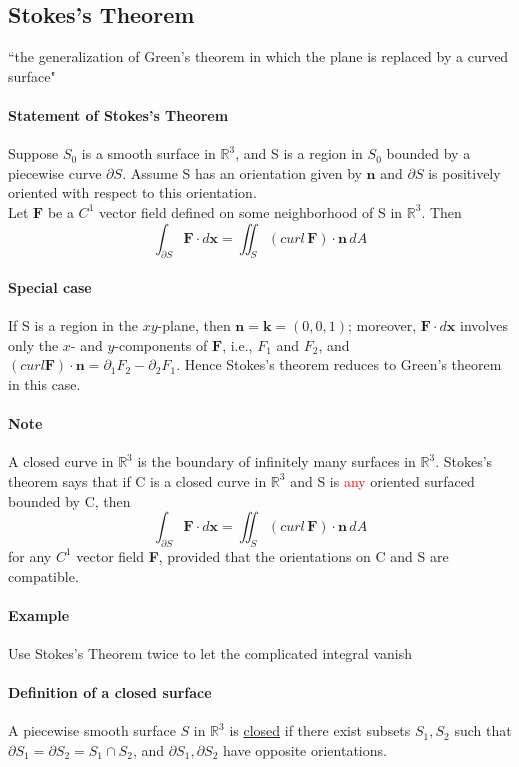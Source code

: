 \documentclass[11pt]{article}
\newcommand{\tb}[1]{\textbf{#1}}
\newcommand{\real}[0]{\mathbb{R}}
\newcommand{\under}[1]{\underline{#1}}
\newcommand{\vx}[0]{\tb{x}}
\newcommand{\vf}[0]{\tb{F}}
\newcommand{\p}[0]{\partial}
\begin{document}
\subsection{Stokes's Theorem}
``the generalization of Green's theorem in which the plane is replaced by a curved surface"
\paragraph{Statement of Stokes's Theorem} Suppose $S_0$ is a smooth surface in $\real^3$, and S is a region in $S_0$ bounded by a piecewise curve $\partial S$. Assume S has an orientation given by $\tb{n}$ and $\partial S$ is positively oriented with respect to this orientation.\\
Let $\tb{F}$ be a $C^1$ vector field defined on some neighborhood of S in $\real^3$. Then
$$\int_{\partial S} \tb{F}\cdot d\vx = \iint_S (curl \, \vf)\cdot \tb{n} \,dA$$
\paragraph{Special case} If S is a region in the $xy$-plane, then $\tb{n} = \tb{k} = (0,0,1)$; moreover, $\vf \cdot d\vx$ involves only the $x$- and $y$-components of $\vf$, i.e., $F_1$ and $F_2$, and $(curl \vf) \cdot \tb{n} = \partial_1 F_2 - \partial_2 F_1$. Hence Stokes's theorem reduces to Green's theorem in this case.
\paragraph{Note} A closed curve in $\real^3$ is the boundary of infinitely many surfaces in $\real^3$. Stokes's theorem says that if C is a closed curve in $\real^3$ and S is \textcolor{red}{any} oriented surfaced bounded by C, then 
$$\int_{\partial S} \tb{F}\cdot d\vx = \iint_S (curl \, \vf)\cdot \tb{n} \,dA$$
for any $C^1$ vector field \tb{F}, provided that the orientations on C and S are compatible.

\paragraph{Example}
Use Stokes's Theorem twice to let the complicated integral vanish

\paragraph{Definition of a closed surface} A piecewise smooth surface $S$ in $\real^3$ is \under{closed} if there exist subsets $S_1, S_2$ such that $\p S_1 = \p S_2 = S_1 \cap S_2$, and $\p S_1, \p S_2$ have opposite orientations.
\end{document}
